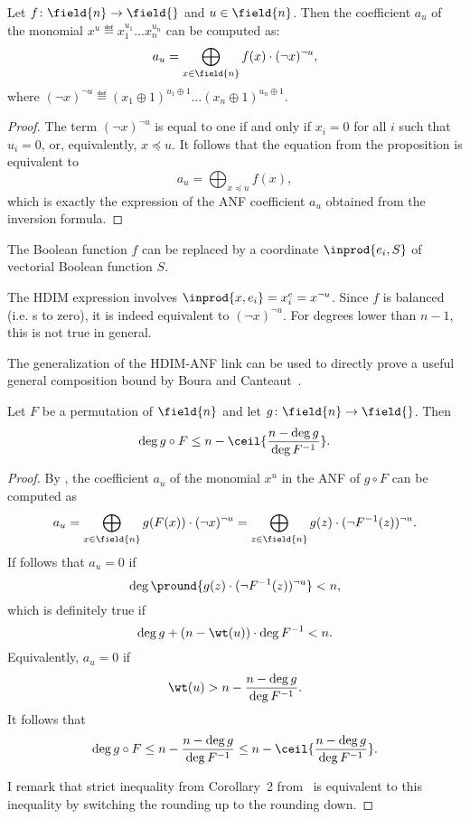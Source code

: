 \begin{proposition}
Let $f\colon \field{n} \to \field{}$ and $u \in \field{n}$. Then the coefficient $a_u$ of the monomial $x^u \eqdef x_1^{u_1}\ldots x_n^{u_n}$ can be computed as:
$$
a_u = \bigoplus_{x \in \field{n}} f(x) \cdot (\lnot x)^{\lnot u},
$$
where $(\lnot x)^{\lnot u} \eqdef (x_1 \oplus 1)^{u_1 \oplus 1}\ldots (x_n \oplus 1)^{u_n \oplus 1}$.
\end{proposition}
\begin{proof}
The term $(\lnot x)^{\lnot u}$ is equal to one if and only if $x_i = 0$ for all $i$ such that $u_i = 0$, or, equivalently, $x \preceq u$. It follows that the equation from the proposition is equivalent to
$$
a_u = \bigoplus_{x\preceq u} f(x),
$$
which is exactly the expression of the ANF coefficient $a_u$ obtained from the \Mobius{} inversion formula.
\end{proof}

\begin{remark}
The Boolean function $f$ can be replaced by a coordinate $\inprod{e_i, S}$ of vectorial Boolean function $S$.
\end{remark}

\begin{remark}
The HDIM expression involves $\inprod{x, e_i} = x^e_i = x^{\lnot u}$. Since $f$ is balanced (i.e. \txor{}s to zero), it is indeed equivalent to $(\lnot x)^{\lnot u}$. For degrees lower than $n-1$, this is not true in general.
\end{remark}

The generalization of the HDIM-ANF link can be used to directly prove a useful general composition bound by Boura and Canteaut~\cite[Corollary~2]{influence}.

\begin{proposition}
Let $F$ be a permutation of $\field{n}$ and let $g\colon \field{n} \to \field{}$. Then
$$
\deg{g\circ F} \le n - \ceil{\frac{n- \deg{g}}{\deg{F^{-1}}}}.
$$
\end{proposition}
\begin{proof}
By , the coefficient $a_u$ of the monomial $x^u$ in the ANF of $g \circ F$ can be computed as
$$
a_u = \bigoplus_{x\in \field{n}} g(F(x)) \cdot (\lnot x)^{\lnot u} = \bigoplus_{z \in \field{n}} g(z) \cdot (\lnot F^{-1}(z))^{\lnot u}.
$$
If follows that $a_u = 0$ if
$$
\deg{\pround{g(z) \cdot (\lnot F^{-1}(z))^{\lnot u}}} < n,
$$
which is definitely true if
$$
\deg{g} + (n - \wt(u)) \cdot \deg{F^{-1}} < n.
$$
Equivalently, $a_u = 0$ if
$$
\wt(u) > n - \frac{n-\deg{g}}{\deg{F^{-1}}}.
$$
It follows that
$$
\deg{g\circ F} \le n - \frac{n-\deg{g}}{\deg{F^{-1}}} \le n - \ceil{\frac{n-\deg{g}}{\deg{F^{-1}}}}.
$$

I remark that strict inequality from Corollary~2 from~\cite{influence} is equivalent to this inequality by switching the rounding up to the rounding down.
\end{proof}